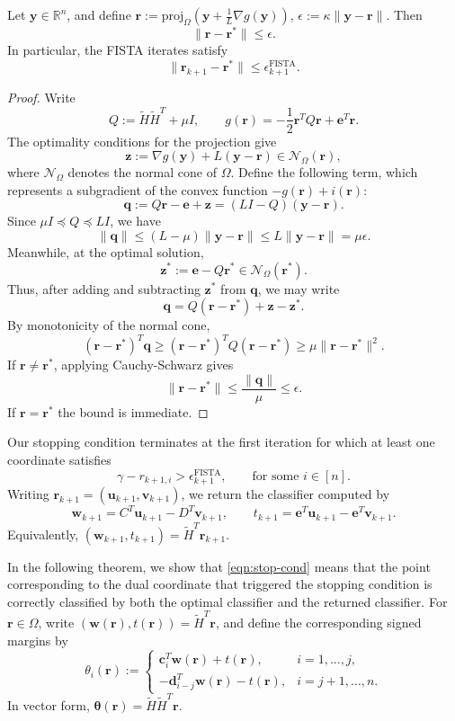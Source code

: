 \documentclass[twoside,11pt]{article}
\newcommand\proj{\mathrm{proj}}
\newcommand{\btheta}{\bm{\theta}}
\renewcommand{\c}{\bm{c}}
\renewcommand{\d}{\bm{d}}
\newcommand\q{\bm{q}}
\renewcommand\r{\bm{r}}
\renewcommand\u{\bm{u}}
\renewcommand\v{\bm{v}}
\newcommand\w{\bm{w}}
\newcommand\y{\bm{y}}
\newcommand\z{\bm{z}}
\newcommand\e{\bm{e}}
\newcommand\mN{\mathcal{N}}
\newcommand\tH{\tilde{H}}
\begin{document}
\begin{theorem}
\label{thm:dist-to-opt-dual}
Let $\y\in\mathbb{R}^n$, and define $\r := \proj_{\Omega}(\y + \frac{1}{L}\nabla g(\y))$, $\epsilon := \kappa \|\y - \r\|$.
Then
\[
    \|\r-\r^*\|\leq\epsilon.
\]
In particular, the FISTA iterates satisfy
\[
    \|\r_{k+1} - \r^*\| \leq \epsilon_{k+1}^{\mathrm{FISTA}}.
\]
\end{theorem}
\begin{proof}
Write
\[
    Q:=\tH\tH^{T}+\mu I,
    \qquad g(\r) = -\frac{1}{2}\r^{T}Q\r +\e^{T}\r.
\]
The optimality conditions for the projection give
\[
    \z := \nabla g(\y) + L(\y-\r) \in \mN_{\Omega}(\r),
\]
where $\mN_{\Omega}$ denotes the normal cone of $\Omega$.
Define the following term, which represents a subgradient of the convex function $-g(\r) + i(\r)$:
\begin{equation} \label{eqn:comp-subg}
    \q := Q\r-\e+\z = (LI-Q)(\y-\r).
\end{equation}
Since $\mu I\preceq Q\preceq LI$, we have
\begin{equation} \label{eqn:q-bound}
    \|\q\| \leq (L-\mu)\|\y-\r\| \leq L\|\y - \r\| = \mu\epsilon.
\end{equation}
Meanwhile, at the optimal solution,
\[
    \z^* := \e-Q\r^* \in \mN_{\Omega}(\r^*).
\]
Thus, after adding and subtracting $\z^*$ from $\q$, we may write
\[
    \q = Q(\r-\r^*) + \z-\z^*.
\]
By monotonicity of the normal cone,
\[
    (\r-\r^*)^T\q \geq (\r-\r^*)^TQ(\r - \r^*) \geq \mu\|\r-\r^*\|^2.
\]
If $\r\neq\r^*$, applying Cauchy-Schwarz gives
\[
    \|\r-\r^*\| \leq \frac{\|\q\|}{\mu} \leq \epsilon.
\]
If $\r=\r^*$ the bound is immediate.
\end{proof}

Our stopping condition terminates at the first iteration for which at least one coordinate satisfies
\begin{equation} \label{eqn:stop-cond}
    \gamma-r_{k+1,i} > \epsilon_{k+1}^{\mathrm{FISTA}},\qquad\text{for some $i \in [n]$.}
\end{equation}
Writing
$\r_{k+1} = (\u_{k+1},\v_{k+1})$, we return the classifier computed by
\[
    \w_{k+1} = C^{T}\u_{k+1} - D^{T}\v_{k+1},\qquad t_{k+1} = \e^{T}\u_{k+1} - \e^{T}\v_{k+1}.
\]
Equivalently, $(\w_{k+1},t_{k+1}) = \tH^{T}\r_{k+1}$.

In the following theorem, we show that \eqref{eqn:stop-cond} means that the point corresponding to the dual coordinate that triggered the stopping condition is correctly classified by both the optimal classifier and the returned classifier. For $\r \in \Omega$, write $(\w(\r), t(\r)) = \tH^T\r$, and define the corresponding signed margins by
\[
    \theta_i(\r) := \begin{cases}
        \c_i^{T}\w(\r) + t(\r), & i=1,\ldots,j,\\
        -\d_{i-j}^{T}\w(\r) - t(\r),& i=j+1,\ldots,n.
    \end{cases}
\]
In vector form, $\btheta(\r) = \tH\tH^T\r$.
\end{document}
